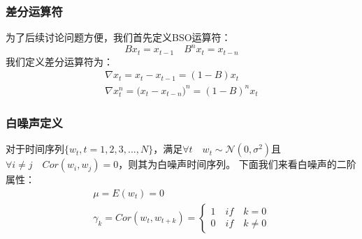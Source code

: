 \documentclass{article}
\begin{document}
\subsubsection{差分运算符}
为了后续讨论问题方便，我们首先定义BSO运算符：
\begin{equation}
Bx_{t}=x_{t-1} \quad B^{n}x_{t}=x_{t-n}
\label{e000018}
\end{equation}
我们定义差分运算符为：
\begin{equation}
\begin{aligned}
\nabla x_{t} = x_{t}-x_{t-1}=(1-B)x_{t} \\
\nabla x_{t}^{n} = \big( x_{t}-x_{t-n} \big)^{n}=(1-B)^{n}x_{t}
\end{aligned}
\label{e000019}
\end{equation}
\subsubsection{白噪声定义}
对于时间序列$\{ w_{t}, t=1,2,3,...,N \}$，满足$\forall t \quad w_{t} \sim \mathcal{N}(0, \sigma ^{2})$且$\forall i \ne j \quad Cor(w_{i}, w_{j})=0$，则其为白噪声时间序列。\newline
下面我们来看白噪声的二阶属性：
\begin{equation}
\begin{aligned}
\mu = E(w_{t})=0 \\
\gamma _{k}= Cor(w_{t}, w_{t+k}) = \begin{cases}
1 \quad if \quad k=0 \\
0 \quad if \quad k \ne 0
\end{cases}
\end{aligned}
\label{e000020}
\end{equation}
\end{document}
